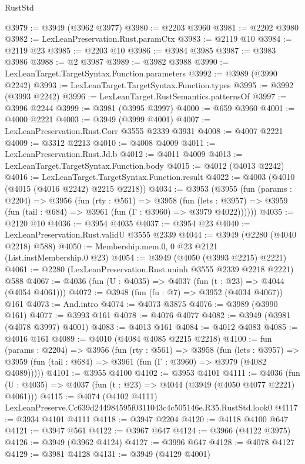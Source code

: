 \begin{lexlean}{RustStd}
\begin{coremodule}
@3979 := @3949 (@3962 @3977)
@3980 := @2203 @3960
@3981 := @2202 @3980
@3982 := LexLeanPreservation.Rust.paramCtx
@3983 := @2119 @10
@3984 := @2119 @23
@3985 := @2203 @10
@3986 := @3984 @3985
@3987 := @3983 @3986
@3988 := @2 @3987
@3989 := @3982 @3988
@3990 := LexLeanTarget.TargetSyntax.Function.parameters
@3992 := @3989 (@3990 @2242)
@3993 := LexLeanTarget.TargetSyntax.Function.types
@3995 := @3992 (@3993 @2242)
@3996 := LexLeanTarget.RustSemantics.patternsOf
@3997 := @3996 @2244
@3999 := @3981 (@3995 @3997)
@4000 := @659 @3960
@4001 := @4000 @2221
@4003 := @3949 (@3999 @4001)
@4007 := LexLeanPreservation.Rust.Corr @3555 @2339 @3931
@4008 := @4007 @2221
@4009 := @3312 @2213
@4010 := @4008 @4009
@4011 := LexLeanPreservation.Rust.Jd.b
@4012 := @4011 @4009
@4013 := LexLeanTarget.TargetSyntax.Function.body
@4015 := @4012 (@4013 @2242)
@4016 := LexLeanTarget.TargetSyntax.Function.result
@4022 := @4003 (@4010 (@4015 (@4016 @2242) @2215 @2218))
@4034 := @3953
    (@3955
      (fun (params : @2204) =>
      @3956
        (fun (rty : @561) =>
        @3958
          (fun (lets : @3957) =>
          @3959 (fun (tail : @684) => @3961 (fun (Γ : @3960) => @3979 @4022))))))
@4035 := @2120 @10
@4036 := @3954 @4035
@4037 := @3954 @23
@4040 := LexLeanPreservation.Rust.validU @3555 @2339
@4044 := @3949 (@2280 (@4040 @2218) @588)
@4050 := Membership.mem.{0, 0} @23 @2121 (List.instMembership.{0} @23)
@4054 := @3949 (@4050 (@3993 @2215) @2221)
@4061 := @2280 (LexLeanPreservation.Rust.uninh @3555 @2339 @2218 @2221) @588
@4067 := @4036 (fun (U : @4035) => @4037 (fun (t : @23) => @4044 (@4054 @4061)))
@4072 := @3948 (fun (fn : @7) => @3952 (@4034 @4067)) @161
@4073 := And.intro
@4074 := @4073 @3875
@4076 := @3989 (@3990 @161)
@4077 := @3993 @161
@4078 := @4076 @4077
@4082 := @3949 (@3981 (@4078 @3997) @4001)
@4083 := @4013 @161
@4084 := @4012 @4083
@4085 := @4016 @161
@4089 := @4010 (@4084 @4085 @2215 @2218)
@4100 := fun (params : @2204) =>
  @3956
    (fun (rty : @561) =>
    @3958
      (fun (lets : @3957) =>
      @3959 (fun (tail : @684) => @3961 (fun (Γ : @3960) => @3979 (@4082 @4089)))))
@4101 := @3955 @4100
@4102 := @3953 @4101
@4111 := @4036 (fun (U : @4035) => @4037 (fun (t : @23) => @4044 (@3949 (@4050 @4077 @2221) @4061)))
@4115 := @4074 (@4102 @4111) LexLeanPreserve.Cc639d244984595f0311043c4c505146e.R35.RustStd.look0
@4117 := @3934 @4101 @4111
@4118 := @3947 @2204
@4120 := @4118 @4100 @647
@4121 := @3947 @561
@4122 := @3967 @647
@4124 := @3966 (@4122 @3975)
@4126 := @3949 (@3962 @4124)
@4127 := @3996 @647
@4128 := @4078 @4127
@4129 := @3981 @4128
@4131 := @3949 (@4129 @4001)

\end{coremodule}
\end{lexlean}
